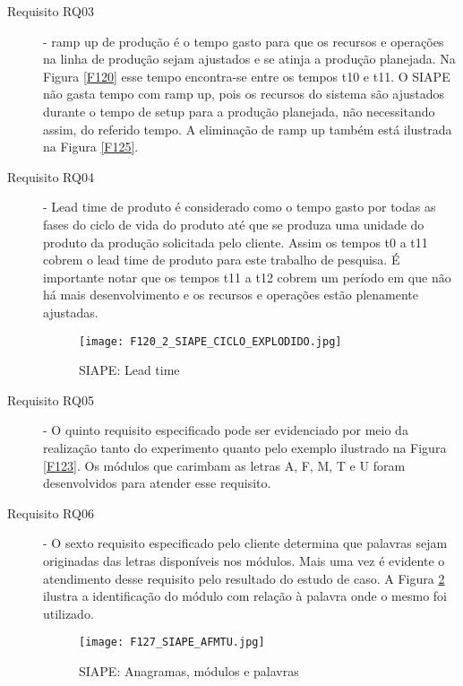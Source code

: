 \begin{description}
	\item[Requisito RQ03] - ramp up de produção é o tempo gasto para que os recursos e operações na linha de produção sejam ajustados e se atinja a produção planejada. Na Figura \ref{F120} esse tempo encontra-se entre os tempos t10 e t11.  O SIAPE não gasta tempo com ramp up, pois os recursos do sistema são ajustados durante o tempo de setup para a produção planejada, não necessitando assim, do referido tempo. A eliminação de ramp up também está ilustrada na Figura \ref{F125}.
	
	
	\item[Requisito RQ04] -  Lead time de produto é considerado como o tempo gasto por todas as fases do ciclo de vida do produto  até que se produza uma unidade do produto da produção solicitada pelo cliente. Assim os tempos t0 a t11 cobrem o lead time de produto para este trabalho de pesquisa.  É importante notar que os tempos t11 a t12 cobrem um período em que não há mais desenvolvimento e os recursos e operações estão plenamente ajustadas.	
	
	
	\begin{figure}[h]
		\centering
		\texttt{[image: F120\_2\_SIAPE\_CICLO\_EXPLODIDO.jpg]} 
		\caption{SIAPE: Lead time}
		\label{F120_1}
	\end{figure}	
	
	\item[Requisito RQ05] - O quinto requisito especificado pode ser evidenciado por meio da realização tanto do experimento quanto pelo exemplo ilustrado na Figura \ref{F123}.  Os módulos que carimbam as letras A, F, M, T e U foram desenvolvidos para atender esse requisito.\par 
	 
	\item[Requisito RQ06] - O sexto requisito especificado pelo cliente determina que palavras sejam originadas das letras disponíveis nos módulos. Mais uma vez é evidente o atendimento desse requisito pelo resultado do estudo de caso. A Figura \ref{F127} ilustra a identificação do módulo com relação à palavra onde o mesmo foi utilizado.


	\begin{figure}[h]
		\centering
		\texttt{[image: F127\_SIAPE\_AFMTU.jpg]} 
		\caption{SIAPE: Anagramas, módulos e palavras}
		\label{F127}
	\end{figure}	


	
\end{description}					

